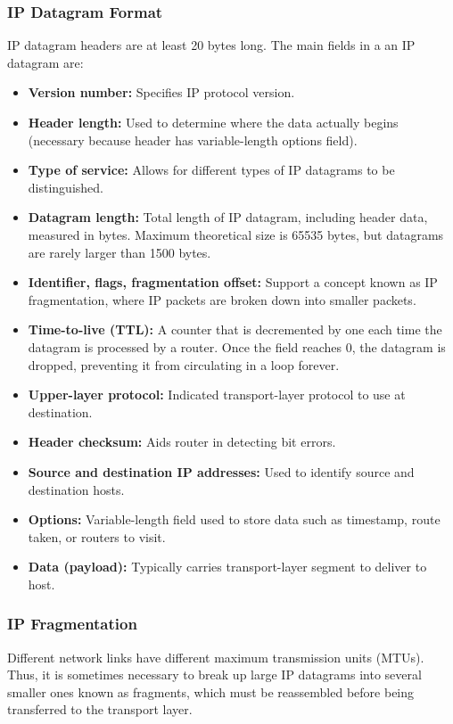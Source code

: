 \documentclass[12pt,titlepage]{article}
\begin{document}
      \subsubsection{IP Datagram Format}
        IP datagram headers are at least 20 bytes long. The main fields in a an IP datagram are:
        \begin{itemize}
          \item \textbf{Version number:} Specifies IP protocol version.
          \item \textbf{Header length:} Used to determine where the data actually begins (necessary because header has variable-length options field).
          \item \textbf{Type of service:} Allows for different types of IP datagrams to be distinguished.
          \item \textbf{Datagram length:} Total length of IP datagram, including header data, measured in bytes. Maximum theoretical size is 65535 bytes,
            but datagrams are rarely larger than 1500 bytes.
          \item \textbf{Identifier, flags, fragmentation offset:} Support a concept known as IP fragmentation, where IP packets are broken down into
            smaller packets.
          \item \textbf{Time-to-live (TTL):} A counter that is decremented by one each time the datagram is processed by a router. Once the field reaches
            0, the datagram is dropped, preventing it from circulating in a loop forever.
          \item \textbf{Upper-layer protocol:} Indicated transport-layer protocol to use at destination.
          \item \textbf{Header checksum:} Aids router in detecting bit errors.
          \item \textbf{Source and destination IP addresses:} Used to identify source and destination hosts.
          \item \textbf{Options:} Variable-length field used to store data such as timestamp, route taken, or routers to visit.
          \item \textbf{Data (payload):} Typically carries transport-layer segment to deliver to host.
        \end{itemize}

      \subsubsection{IP Fragmentation}
        Different network links have different maximum transmission units (MTUs). Thus, it is sometimes necessary to break up large IP datagrams into several
        smaller ones known as fragments, which must be reassembled before being transferred to the transport layer.
\end{document}
